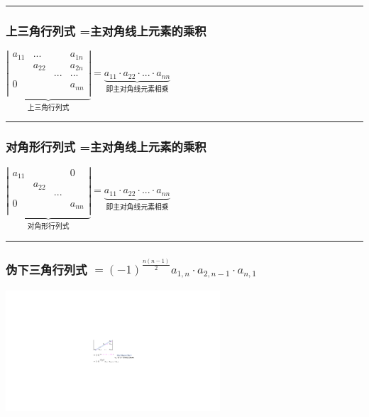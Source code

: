 \documentclass[UTF8]{ctexart}
\begin{document}
\hrule


\subsubsection{上三角行列式 =主对角线上元素的乘积}

$
\underset{\text{上三角行列式}}{\underbrace{\left| \begin{matrix}
			a_{11}&		...&		&		a_{1n}\\
			&		a_{22}&		&		a_{2n}\\
			&		&		...&		...\\
			0&		&		&		a_{nn}\\
		\end{matrix} \right|}}=\underset{\text{即主对角线元素相乘}}{\underbrace{a_{11}\cdot a_{22}\cdot ...\cdot a_{nn}}}
$\\



\hrule


\subsubsection{对角形行列式 =主对角线上元素的乘积}
$
\underset{\text{对角形行列式}}{\underbrace{\left| \begin{matrix}
			a_{11}&		&		&		0\\
			&		a_{22}&		&		\\
			&		&		...&		\\
			0&		&		&		a_{nn}\\
		\end{matrix} \right|}}=\underset{\text{即主对角线元素相乘}}{\underbrace{a_{11}\cdot a_{22}\cdot ...\cdot a_{nn}}}
$\\

\hrule

\subsubsection{伪下三角行列式  $	=\left( -1 \right) ^{\frac{n\left( n-1 \right)}{2}}a_{1,n}\cdot a_{2,n-1}\cdot a_{n,1}	$}

\includegraphics[width=0.6\textwidth]{img/0004.pdf}\\
\end{document}
